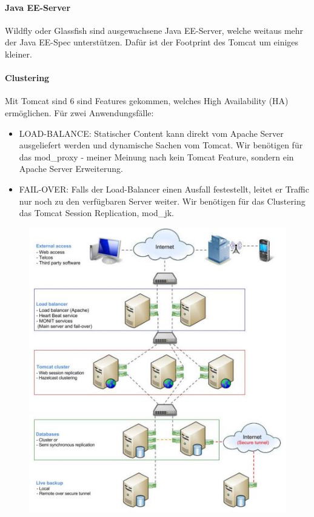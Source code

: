\paragraph{Java EE-Server}
Wildfly oder Glassfish sind ausgewachsene Java EE-Server, welche weitaus mehr der Java EE-Spec unterstützen. Dafür ist der Footprint des Tomcat um einiges kleiner.

\newpage
\paragraph{Clustering}
Mit Tomcat sind 6 sind Features gekommen, welches High Availability (HA) ermöglichen. Für zwei Anwendungsfälle:
\begin{itemize}
	\item LOAD-BALANCE: Statischer Content kann direkt vom Apache Server ausgeliefert werden und dynamische Sachen vom Tomcat. Wir benötigen für das mod\_proxy - meiner Meinung nach kein Tomcat Feature, sondern ein Apache Server Erweiterung.
	\item FAIL-OVER: Falls der Load-Balancer einen Ausfall festestellt, leitet er Traffic nur noch zu den verfügbaren Server weiter. Wir benötigen für das Clustering das Tomcat Session Replication, mod\_jk.
\end{itemize}

\begin{figure}[h!]
\centering
\includegraphics[width=0.7\linewidth]{fig/java-tomcat-clustering}
\caption{}
\label{fig:java-tomcat-clustering}
\end{figure}

